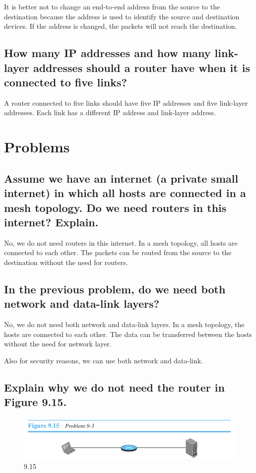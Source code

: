 \documentclass{article}
\begin{document}
It is better not to change an end-to-end address from the source to the destination because the address is used to identify the source and destination devices. If the address is changed, the packets will not reach the destination.

\subsection{
	How many IP addresses and how many link-layer addresses should a router
	have when it is connected to five links?
}

A router connected to five links should have five IP addresses and five link-layer addresses. Each link has a different IP address and link-layer address.


\section{Problems}
\subsection{
	Assume we have an internet (a private small internet) in which all hosts are
	connected in a mesh topology. Do we need routers in this internet? Explain.
}

No, we do not need routers in this internet. In a mesh topology, all hosts are connected to each other. The packets can be routed from the source to the destination without the need for routers.

\subsection{
	In the previous problem, do we need both network and data-link layers?
}

No, we do not need both network and data-link layers. In a mesh topology, the hosts are connected to each other. The data can be transferred between the hosts without the need for network layer.

Also for security reasons, we can use both network and data-link.

\subsection{
	Explain why we do not need the router in Figure 9.15.
}
\begin{figure}[H]
	\center
	\includegraphics[scale=0.5]{9.15.png}
	\caption{9.15}
\end{figure}
\end{document}
